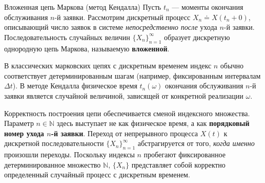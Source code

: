 \begin{definition}{Вложенная цепь Маркова (метод Кендалла)}
Пусть $t_n$ — моменты окончания обслуживания $n$-й заявки. Рассмотрим дискретный процесс $X_n \doteq X(t_n+0)$, описывающий число заявок в системе \textit{непосредственно после} ухода $n$-й заявки. Последовательность случайных величин $\{X_n\}_{n=1}^{\infty}$ образует дискретную однородную цепь Маркова, называемую \textbf{вложенной}.
\end{definition}

\begin{note}[1]
В классических марковских цепях с дискретным временем индекс $n$ обычно соответствует детерминированным шагам (например, фиксированным интервалам $\Delta t$). В методе Кендалла физическое время $t_n(\omega)$ окончания обслуживания $n$-й заявки является случайной величиной, зависящей от конкретной реализации $\omega$. 

Корректность построения цепи обеспечивается сменой индексного множества. Параметр $n \in \mathbb{N}$ здесь выступает не как физическое время, а как \textbf{порядковый номер ухода $n$-й заявки}. Переход от непрерывного процесса $X(t)$ к дискретной последовательности $\{X_n\}_{n=1}^{\infty}$ абстрагируется от того, \textit{когда именно} произошли переходы. Поскольку индексы $n$ пробегают фиксированное детерминированное множество $\mathbb{N}$, $\{X_n\}$ представляет собой корректно определенный случайный процесс с дискретным временем.
\end{note}


